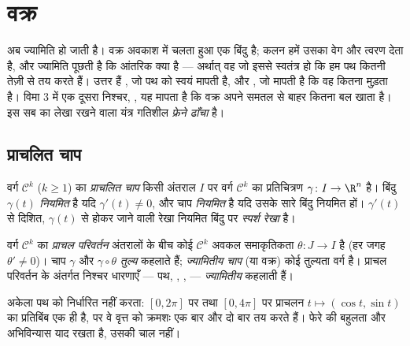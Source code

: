 \chapter{वक्र}\label{ch:b2:curves}

अब ज्यामिति  हो जाती है। वक्र अवकाश में चलता हुआ एक बिंदु है; कलन
हमें उसका वेग और त्वरण देता है, और ज्यामिति पूछती है कि आंतरिक क्या है ---
अर्थात् वह जो इससे स्वतंत्र हो कि हम पथ कितनी तेज़ी से तय करते हैं। उत्तर
हैं \emph{}, जो पथ को स्वयं मापती है, और \emph{}, जो मापती
है कि वह कितना मुड़ता है। विमा $3$ में एक दूसरा निश्चर,
\emph{}, यह मापता है कि वक्र अपने समतल से बाहर कितना बल खाता है। इस
सब का लेखा रखने वाला यंत्र गतिशील \emph{फ्रेने ढाँचा} है।

\section{प्राचलित चाप}

\begin{definition}[प्राचलित चाप]\label{def:b2:curves:arc}
वर्ग $\mathcal{C}^k$ ($k \geq 1$) का \emph{प्राचलित चाप}
किसी अंतराल $I$ पर वर्ग $\mathcal{C}^k$ का प्रतिचित्रण $\gamma \colon I \to \R^n$ है।
बिंदु $\gamma(t)$ \emph{नियमित} है यदि $\gamma'(t) \neq 0$, और चाप \emph{नियमित}
है यदि उसके सारे बिंदु नियमित हों। $\gamma'(t)$ से दिशित, $\gamma(t)$ से होकर
जाने वाली रेखा नियमित बिंदु पर \emph{स्पर्श रेखा} है।
\end{definition}

\begin{definition}[प्राचल परिवर्तन]\label{def:b2:curves:reparam}
वर्ग $\mathcal{C}^k$ का \emph{प्राचल परिवर्तन}
अंतरालों के बीच कोई $\mathcal{C}^k$ अवकल समाकृतिकता $\theta \colon J \to I$ है (हर जगह
$\theta' \neq 0$)। चाप $\gamma$ और $\gamma \circ \theta$ \emph{तुल्य} कहलाते हैं;
\emph{ज्यामितीय चाप} (या वक्र) कोई तुल्यता वर्ग है।
प्राचल परिवर्तन के अंतर्गत निश्चर धारणाएँ --- पथ, ,
,  --- \emph{ज्यामितीय} कहलाती हैं।
\end{definition}

\begin{remark}
अकेला पथ  को निर्धारित नहीं करता: $[0, 2\pi]$ पर तथा
$[0, 4\pi]$ पर प्राचलन $t \mapsto (\cos t, \sin t)$ का प्रतिबिंब एक ही है, पर वे वृत्त को
क्रमशः एक बार और दो बार तय करते हैं।  फेरे की बहुलता और
अभिविन्यास याद रखता है, उसकी चाल नहीं।
\end{remark}

